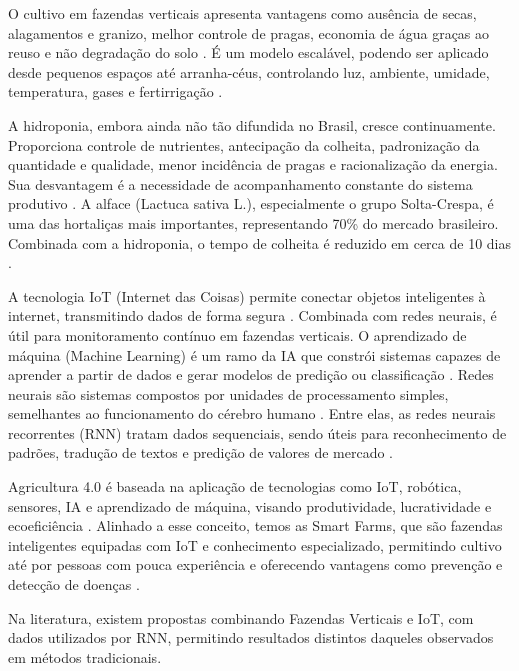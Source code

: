 O cultivo em fazendas verticais apresenta vantagens como ausência de secas, alagamentos e granizo, melhor controle de pragas, economia de água graças ao reuso e não degradação do solo \cite{ingram2023}. É um modelo escalável, podendo ser aplicado desde pequenos espaços até arranha-céus, controlando luz, ambiente, umidade, temperatura, gases e fertirrigação \cite{lucena2021}.

A hidroponia, embora ainda não tão difundida no Brasil, cresce continuamente. Proporciona controle de nutrientes, antecipação da colheita, padronização da quantidade e qualidade, menor incidência de pragas e racionalização da energia. Sua desvantagem é a necessidade de acompanhamento constante do sistema produtivo \cite{luz2006}. A alface (Lactuca sativa L.), especialmente o grupo Solta-Crespa, é uma das hortaliças mais importantes, representando 70\% do mercado brasileiro. Combinada com a hidroponia, o tempo de colheita é reduzido em cerca de 10 dias \cite{luz2006}.

A tecnologia IoT (Internet das Coisas) permite conectar objetos inteligentes à internet, transmitindo dados de forma segura \cite{carnaz2016}. Combinada com redes neurais, é útil para monitoramento contínuo em fazendas verticais. O aprendizado de máquina (Machine Learning) é um ramo da IA que constrói sistemas capazes de aprender a partir de dados e gerar modelos de predição ou classificação \cite{paixao2022}. Redes neurais são sistemas compostos por unidades de processamento simples, semelhantes ao funcionamento do cérebro humano \cite{haykin2001}. Entre elas, as redes neurais recorrentes (RNN) tratam dados sequenciais, sendo úteis para reconhecimento de padrões, tradução de textos e predição de valores de mercado \cite{baronte2022}.

Agricultura 4.0 é baseada na aplicação de tecnologias como IoT, robótica, sensores, IA e aprendizado de máquina, visando produtividade, lucratividade e ecoeficiência \cite{lisbinski2020}. Alinhado a esse conceito, temos as Smart Farms, que são fazendas inteligentes equipadas com IoT e conhecimento especializado, permitindo cultivo até por pessoas com pouca experiência e oferecendo vantagens como prevenção e detecção de doenças \cite{ryu2015}.

Na literatura, existem propostas combinando Fazendas Verticais e IoT, com dados utilizados por RNN, permitindo resultados distintos daqueles observados em métodos tradicionais.